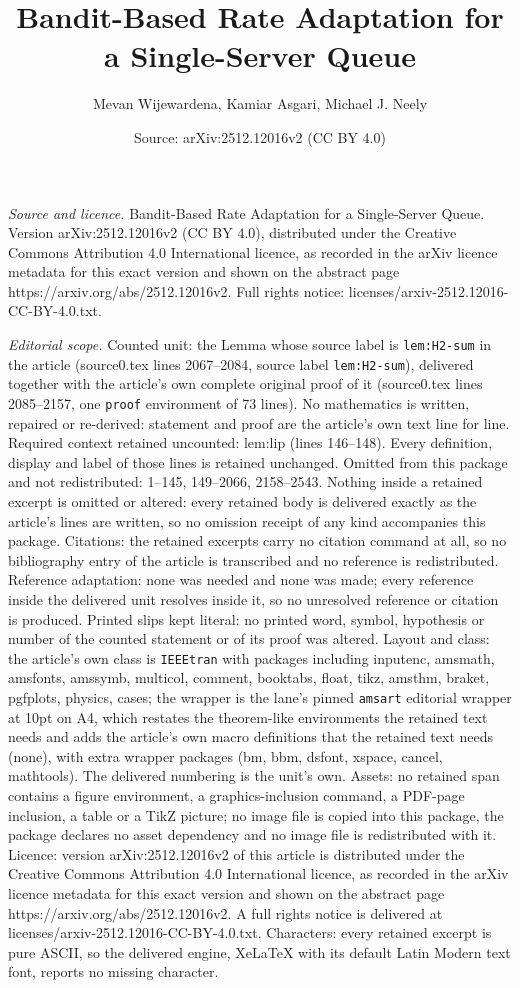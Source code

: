 \documentclass[10pt,a4paper]{amsart}
\title[Bandit-Based Rate Adaptation for a Single-Server Queue]{Bandit-Based Rate Adaptation for a Single-Server Queue}
\author{Mevan Wijewardena, Kamiar Asgari, Michael J. Neely}
\date{Source: arXiv:2512.12016v2 (CC BY 4.0)}
\begin{document}
\maketitle

\noindent\emph{Source and licence.} Bandit-Based Rate Adaptation for a Single-Server Queue. Version arXiv:2512.12016v2 (CC BY 4.0), distributed under the Creative Commons Attribution 4.0 International licence, as recorded in the arXiv licence metadata for this exact version and shown on the abstract page https://arxiv.org/abs/2512.12016v2. Full rights notice: licenses/arxiv-2512.12016-CC-BY-4.0.txt.\par\smallskip

\noindent\textit{Editorial scope.} Counted unit: the Lemma whose source label is \texttt{lem:H2-sum} in the article (source0.tex lines 2067--2084, source label \texttt{lem:H2-sum}), delivered together with the article's own complete original proof of it (source0.tex lines 2085--2157, one \texttt{proof} environment of 73 lines). No mathematics is written, repaired or re-derived: statement and proof are the article's own text line for line. Required context retained uncounted: lem:lip (lines 146--148). Every definition, display and label of those lines is retained unchanged. Omitted from this package and not redistributed: 1--145, 149--2066, 2158--2543. Nothing inside a retained excerpt is omitted or altered: every retained body is delivered exactly as the article's lines are written, so no omission receipt of any kind accompanies this package. Citations: the retained excerpts carry no citation command at all, so no bibliography entry of the article is transcribed and no reference is redistributed. Reference adaptation: none was needed and none was made; every reference inside the delivered unit resolves inside it, so no unresolved reference or citation is produced. Printed slips kept literal: no printed word, symbol, hypothesis or number of the counted statement or of its proof was altered. Layout and class: the article's own class is \texttt{IEEEtran} with packages including inputenc, amsmath, amsfonts, amssymb, multicol, comment, booktabs, float, tikz, amsthm, braket, pgfplots, physics, cases; the wrapper is the lane's pinned \texttt{amsart} editorial wrapper at 10pt on A4, which restates the theorem-like environments the retained text needs and adds the article's own macro definitions that the retained text needs (none), with extra wrapper packages (bm, bbm, dsfont, xspace, cancel, mathtools). The delivered numbering is the unit's own. Assets: no retained span contains a figure environment, a graphics-inclusion command, a PDF-page inclusion, a table or a TikZ picture; no image file is copied into this package, the package declares no asset dependency and no image file is redistributed with it. Licence: version arXiv:2512.12016v2 of this article is distributed under the Creative Commons Attribution 4.0 International licence, as recorded in the arXiv licence metadata for this exact version and shown on the abstract page https://arxiv.org/abs/2512.12016v2. A full rights notice is delivered at licenses/arxiv-2512.12016-CC-BY-4.0.txt. Characters: every retained excerpt is pure ASCII, so the delivered engine, XeLaTeX with its default Latin Modern text font, reports no missing character.
\end{document}
